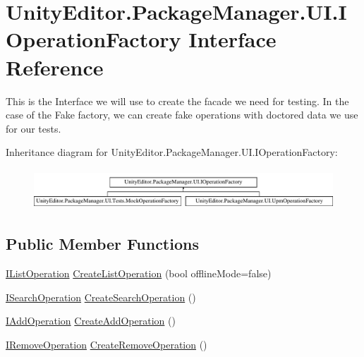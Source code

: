 \hypertarget{interface_unity_editor_1_1_package_manager_1_1_u_i_1_1_i_operation_factory}{}\section{Unity\+Editor.\+Package\+Manager.\+U\+I.\+I\+Operation\+Factory Interface Reference}
\label{interface_unity_editor_1_1_package_manager_1_1_u_i_1_1_i_operation_factory}


This is the Interface we will use to create the facade we need for testing. In the case of the Fake factory, we can create fake operations with doctored data we use for our tests.  


Inheritance diagram for Unity\+Editor.\+Package\+Manager.\+U\+I.\+I\+Operation\+Factory\+:\begin{figure}[H]
\begin{center}
\leavevmode
\includegraphics[height=1.521739cm]{interface_unity_editor_1_1_package_manager_1_1_u_i_1_1_i_operation_factory}
\end{center}
\end{figure}
\subsection*{Public Member Functions}
\begin{DoxyCompactItemize}
\item 
\mbox{\hyperlink{interface_unity_editor_1_1_package_manager_1_1_u_i_1_1_i_list_operation}{I\+List\+Operation}} \mbox{\hyperlink{interface_unity_editor_1_1_package_manager_1_1_u_i_1_1_i_operation_factory_a4a8dc6a8401962d62f9fe1e4eb83cde6}{Create\+List\+Operation}} (bool offline\+Mode=false)
\item 
\mbox{\hyperlink{interface_unity_editor_1_1_package_manager_1_1_u_i_1_1_i_search_operation}{I\+Search\+Operation}} \mbox{\hyperlink{interface_unity_editor_1_1_package_manager_1_1_u_i_1_1_i_operation_factory_a1e4b0e667c493749785f3444697e59ce}{Create\+Search\+Operation}} ()
\item 
\mbox{\hyperlink{interface_unity_editor_1_1_package_manager_1_1_u_i_1_1_i_add_operation}{I\+Add\+Operation}} \mbox{\hyperlink{interface_unity_editor_1_1_package_manager_1_1_u_i_1_1_i_operation_factory_a50ed4e82d0709f835d61b47331a464ac}{Create\+Add\+Operation}} ()
\item 
\mbox{\hyperlink{interface_unity_editor_1_1_package_manager_1_1_u_i_1_1_i_remove_operation}{I\+Remove\+Operation}} \mbox{\hyperlink{interface_unity_editor_1_1_package_manager_1_1_u_i_1_1_i_operation_factory_aa8a45874d7de57734cf4d7591b07c561}{Create\+Remove\+Operation}} ()
\end{DoxyCompactItemize}


